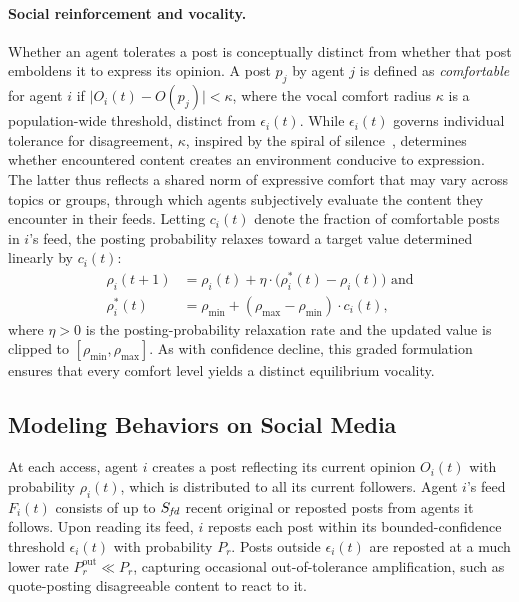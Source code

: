 \documentclass{svproc}
\def\post{\rho}                 %
\def\BoundedConfidence{\epsilon} %
\def\feed{F}                    %
\def\maxfeed{S_{\it fd}}         %
\def\VCR{\kappa}                 %
\begin{document}
\paragraph{Social reinforcement and vocality.} 
Whether an agent tolerates a post is conceptually distinct from
whether that post emboldens it to express its opinion. A post $p_j$ by
agent $j$ is defined as \emph{comfortable} for agent $i$ if
$\vert O_i(t)-O(p_j)\vert <\VCR$, where the vocal comfort radius
$\VCR$ is a population-wide threshold, distinct from
$\BoundedConfidence_i(t)$. While $\BoundedConfidence_i(t)$ governs
individual tolerance for disagreement, $\VCR$, inspired by the spiral of
silence~\cite{noelle-neumann1974}, determines whether encountered
content creates an environment conducive to expression. The latter
thus reflects a shared norm of expressive comfort that may vary across topics
or groups, through which agents subjectively evaluate the content 
they encounter in their feeds.
 Letting $c_i(t)$ denote the fraction of comfortable posts
in $i$'s feed, the posting probability relaxes toward a target value
determined linearly by $c_i(t)$:
%
\begin{equation}\label{eq:social-reinforcement}
  \begin{aligned}
    \post_i(t{+}1) &=
    \post_i(t) + \eta\cdot\big(\post_i^{\ast}(t)-\post_i(t)\big) \text{ and}\\
        \post_i^{\ast}(t) &=
    \post_{\min} + (\post_{\max}-\post_{\min})\cdot c_i(t),
  \end{aligned}
\end{equation}
%
where $\eta>0$ is the posting-probability relaxation rate and the
updated value is clipped to $[\post_{\min},\post_{\max}]$. As with
confidence decline, this graded 
formulation ensures that every comfort level yields a distinct
equilibrium vocality.
\par


\subsection{Modeling Behaviors on Social Media}\label{sec:model-behaviors}
At each access, agent $i$ creates a post reflecting its current
opinion $O_i(t)$ with probability $\post_i(t)$, which is distributed
to all its current followers. Agent $i$'s feed $\feed_i(t)$ consists
of up to $\maxfeed$ recent original or reposted posts from agents it
follows. Upon reading its feed, $i$ reposts each post within its
bounded-confidence threshold $\BoundedConfidence_i(t)$ with
probability $P_r$. Posts outside $\BoundedConfidence_i(t)$ are
reposted at a much lower rate $P_r^{\text{out}}\ll P_r$, capturing
occasional out-of-tolerance amplification, such as quote-posting
disagreeable content to react to it.
\par
\end{document}
